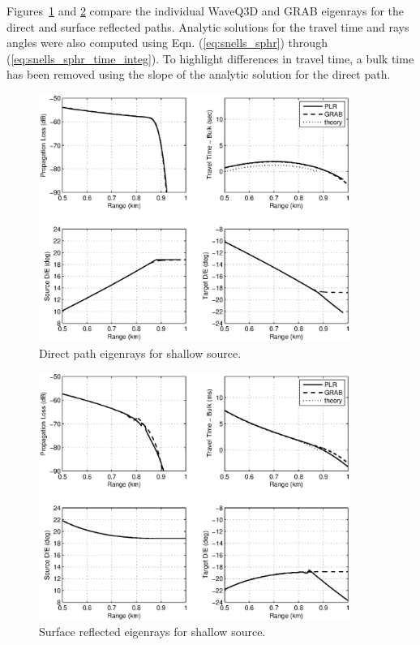 \documentclass{ws-jca}
\begin{document}
Figures~\ref{fig:pedersen_shallow_compare1} and
\ref{fig:pedersen_shallow_compare2} compare the individual WaveQ3D and GRAB
eigenrays for the direct and surface reflected paths. Analytic solutions
for the travel time and rays angles were also computed using Eqn.
(\ref{eq:snells_sphr}) through (\ref{eq:snells_sphr_time_integ}). To highlight
differences in travel time, a bulk time has been removed using the slope of
the analytic solution for the direct path.  
\begin{figure}[th]
	\centerline{\includegraphics[width=4in]{pedersen_shallow_compare1.eps}} 
	\vspace*{8pt}
	\caption{Direct path eigenrays for shallow source. 
	\label{fig:pedersen_shallow_compare1}}
\end{figure}
\begin{figure}[th]
	\centerline{\includegraphics[width=4in]{pedersen_shallow_compare2.eps}} 
	\vspace*{8pt}
	\caption{Surface reflected eigenrays for shallow source. 
	\label{fig:pedersen_shallow_compare2}}
\end{figure}
\end{document}

